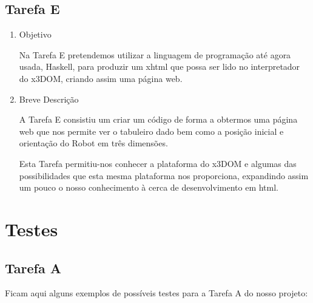 \documentclass[a4paper, 12pt, portuguese]{article}
\begin{document}
\subsection{Tarefa E}
\begin{enumerate}
\item{Objetivo}

Na Tarefa E pretendemos utilizar a linguagem de programação até agora usada, Haskell, para produzir um xhtml que possa ser lido no interpretador do x3DOM, criando assim uma página web.

\item{Breve Descrição}

A Tarefa E consistiu um criar um código de forma a obtermos uma página web que nos permite ver o tabuleiro dado bem como a posição inicial e orientação do Robot em três dimensões.

Esta Tarefa permitiu-nos conhecer a plataforma do x3DOM e algumas das possibilidades que esta mesma plataforma nos proporciona, expandindo assim um pouco o nosso conhecimento à cerca de desenvolvimento em html.

\end{enumerate}

\section{Testes}

\subsection{Tarefa A}

Ficam aqui alguns exemplos de possíveis testes para a Tarefa A do nosso projeto:
\end{document}
